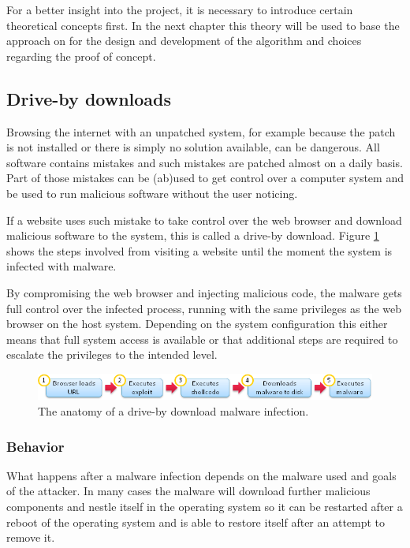 For a better insight into the project, it is necessary to introduce certain theoretical concepts first. In the next chapter this theory will be used to base the approach on for the design and development of the algorithm and choices regarding the proof of concept.

\subsection{Drive-by downloads}

Browsing the internet with an unpatched system, for example because the patch is not installed or there is simply no solution available, can be dangerous. All software contains mistakes and such mistakes are patched almost on a daily basis. Part of those mistakes can be (ab)used to get control over a computer system and be used to run malicious software without the user noticing.

If a website uses such mistake to take control over the web browser and download malicious software to the system, this is called a drive-by download. Figure \ref{fig:dbdownload} shows the steps involved from visiting a website until the moment the system is infected with malware.

By compromising the web browser and injecting malicious code, the malware gets full control over the infected process, running with the same privileges as the web browser on the host system. Depending on the system configuration this either means that full system access is available or that additional steps are required to escalate the privileges to the intended level.


\begin{figure}[h]
    \centering
    \includegraphics[width=12cm]{Images/drive-by-download.png}
    \caption{The anatomy of a drive-by download malware infection. \cite{http://blog.armorize.com/2011/04/newest-adobe-flash-0-day-used-in-new.html (modified)}}
    \label{fig:dbdownload}
\end{figure}

\subsubsection{Behavior}

What happens after a malware infection depends on the malware used and goals of the attacker. In many cases the malware will download further malicious components and nestle itself in the operating system so it can be restarted after a reboot of the operating system and is able to restore itself after an attempt to remove it.

